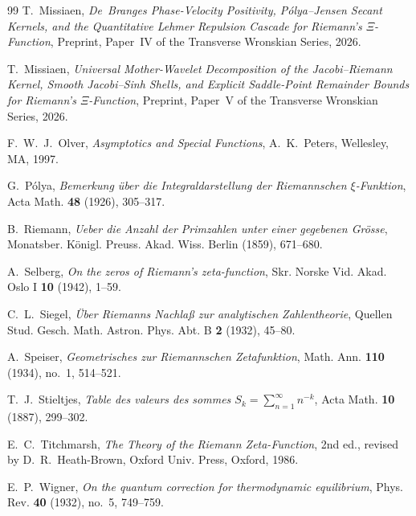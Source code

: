 \documentclass[11pt,reqno]{amsart}
\theoremstyle{definition}
\theoremstyle{remark}
\numberwithin{equation}{section}
\begin{document}
\begin{thebibliography}{99}
T.~Missiaen,
\emph{De~Branges Phase-Velocity Positivity, P\'olya--Jensen Secant Kernels, and the Quantitative Lehmer Repulsion Cascade for Riemann's $\Xi$-Function},
Preprint, Paper~IV of the Transverse Wronskian Series, 2026.

T.~Missiaen,
\emph{Universal Mother-Wavelet Decomposition of the Jacobi--Riemann Kernel, Smooth Jacobi--Sinh Shells, and Explicit Saddle-Point Remainder Bounds for Riemann's $\Xi$-Function},
Preprint, Paper~V of the Transverse Wronskian Series, 2026.

F.~W.~J.~Olver,
\emph{Asymptotics and Special Functions},
A.~K.~Peters, Wellesley, MA, 1997.

G.~P\'olya,
\emph{Bemerkung \"uber die Integraldarstellung der Riemannschen $\xi$-Funktion},
Acta Math. \textbf{48} (1926), 305--317.

B.~Riemann,
\emph{Ueber die Anzahl der Primzahlen unter einer gegebenen Gr\"osse},
Monatsber. K\"onigl. Preuss. Akad. Wiss. Berlin (1859), 671--680.

A.~Selberg,
\emph{On the zeros of Riemann's zeta-function},
Skr. Norske Vid. Akad. Oslo I \textbf{10} (1942), 1--59.

C.~L.~Siegel,
\emph{\"Uber Riemanns Nachla\ss{} zur analytischen Zahlentheorie},
Quellen Stud. Gesch. Math. Astron. Phys. Abt. B \textbf{2} (1932), 45--80.

A.~Speiser,
\emph{Geometrisches zur Riemannschen Zetafunktion},
Math. Ann. \textbf{110} (1934), no.~1, 514--521.

T.~J.~Stieltjes,
\emph{Table des valeurs des sommes $S_k = \sum_{n=1}^{\infty} n^{-k}$},
Acta Math. \textbf{10} (1887), 299--302.

E.~C.~Titchmarsh,
\emph{The Theory of the Riemann Zeta-Function},
2nd ed., revised by D.~R.~Heath-Brown, Oxford Univ. Press, Oxford, 1986.

E.~P.~Wigner,
\emph{On the quantum correction for thermodynamic equilibrium},
Phys. Rev. \textbf{40} (1932), no.~5, 749--759.

\end{thebibliography}
\end{document}
